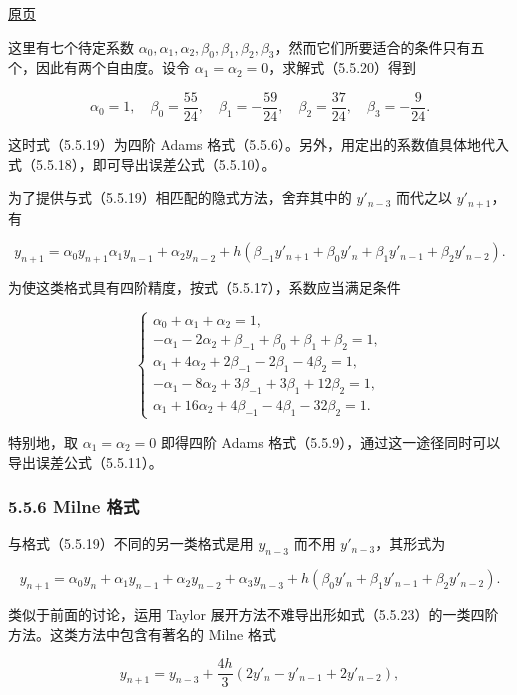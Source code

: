 \documentclass[
  10pt,
  fontset=fandol]{ctexart}
\begin{document}
\href{../../source-images/pdf-143.jpeg}{原页}

这里有七个待定系数 \(\alpha_0,\allowbreak \alpha_1,\allowbreak \alpha_2,\allowbreak \beta_0,\allowbreak \beta_1,\allowbreak \beta_2,\allowbreak \beta_3\)，然而它们所要适合的条件只有五个，因此有两个自由度。设令 \(\alpha_1=\alpha_2=0\)，求解式（5.5.20）得到

\[
\alpha_0=1,\quad\beta_0=\frac{55}{24},\quad\beta_1=-\frac{59}{24},\quad\beta_2=\frac{37}{24},\quad\beta_3=-\frac9{24}.
\]

这时式（5.5.19）为四阶 Adams 格式（5.5.6）。另外，用定出的系数值具体地代入式（5.5.18），即可导出误差公式（5.5.10）。

为了提供与式（5.5.19）相匹配的隐式方法，舍弃其中的 \(y'_{n-3}\) 而代之以 \(y'_{n+1}\)，有

\[
y_{n+1}=\alpha_0y_{n+1}\alpha_1y_{n-1}+\alpha_2y_{n-2}+h(\beta_{-1}y'_{n+1}+\beta_0y'_n+\beta_1y'_{n-1}+\beta_2y'_{n-2}).
\tag{5.5.21}
\]

为使这类格式具有四阶精度，按式（5.5.17），系数应当满足条件

\[
\begin{cases}
\alpha_0+\alpha_1+\alpha_2=1,\\
-\alpha_1-2\alpha_2+\beta_{-1}+\beta_0+\beta_1+\beta_2=1,\\
\alpha_1+4\alpha_2+2\beta_{-1}-2\beta_1-4\beta_2=1,\\
-\alpha_1-8\alpha_2+3\beta_{-1}+3\beta_1+12\beta_2=1,\\
\alpha_1+16\alpha_2+4\beta_{-1}-4\beta_1-32\beta_2=1.
\end{cases}
\tag{5.5.22}
\]

特别地，取 \(\alpha_1=\alpha_2=0\) 即得四阶 Adams 格式（5.5.9），通过这一途径同时可以导出误差公式（5.5.11）。

\subsubsection{5.5.6 Milne 格式}\label{milne-ux683cux5f0f}

与格式（5.5.19）不同的另一类格式是用 \(y_{n-3}\) 而不用 \(y'_{n-3}\)，其形式为

\[
y_{n+1}=\alpha_0y_n+\alpha_1y_{n-1}+\alpha_2y_{n-2}+\alpha_3y_{n-3}+h(\beta_0y'_n+\beta_1y'_{n-1}+\beta_2y'_{n-2}).
\tag{5.5.23}
\]

类似于前面的讨论，运用 Taylor 展开方法不难导出形如式（5.5.23）的一类四阶方法。这类方法中包含有著名的 Milne 格式

\[
y_{n+1}=y_{n-3}+\frac{4h}{3}(2y'_n-y'_{n-1}+2y'_{n-2}),
\tag{5.5.24}
\]
\end{document}
